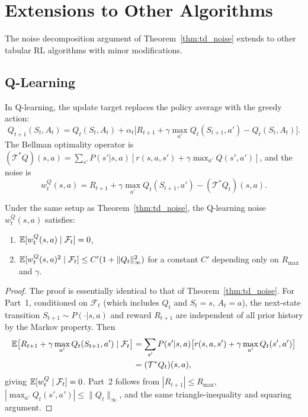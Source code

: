 \documentclass[11pt,a4paper]{article}
\begin{document}

\section{Extensions to Other Algorithms}
\label{sec:extensions}

The noise decomposition argument of Theorem~\ref{thm:td_noise}
extends to other tabular RL algorithms with minor modifications.

\subsection{Q-Learning}

In Q-learning, the update target replaces the policy average
with the greedy action:
\begin{equation}
  Q_{t+1}(S_t, A_t)
  = Q_t(S_t, A_t) + \alpha_t
    \bigl[R_{t+1} + \gamma \max_{a'} Q_t(S_{t+1}, a')
    - Q_t(S_t, A_t)\bigr].
  \label{eq:qlearning}
\end{equation}
The Bellman optimality operator is
$(\mathcal{T}^* Q)(s,a) = \sum_{s'} P(s'|s,a)
[r(s,a,s') + \gamma \max_{a'} Q(s',a')]$, and the noise is
\begin{equation}
  w_t^Q(s,a)
  = R_{t+1} + \gamma \max_{a'} Q_t(S_{t+1}, a')
    - (\mathcal{T}^* Q_t)(s,a).
  \label{eq:qnoise}
\end{equation}

\begin{proposition}
\label{prop:q_noise}
Under the same setup as Theorem~\ref{thm:td_noise}, the
Q-learning noise $w_t^Q(s,a)$ satisfies:
\begin{enumerate}[nosep]
  \item $\mathbb{E}[w_t^Q(s,a) \mid \mathcal{F}_t] = 0$,
  \item $\mathbb{E}[w_t^Q(s,a)^2 \mid \mathcal{F}_t]
    \leq C'(1 + \|Q_t\|_\infty^2)$
    for a constant $C'$ depending only on $R_{\max}$ and
    $\gamma$.
\end{enumerate}
\end{proposition}

\begin{proof}
The proof is essentially identical to that of
Theorem~\ref{thm:td_noise}.  For Part~1, conditioned on
$\mathcal{F}_t$ (which includes $Q_t$ and $S_t = s$,
$A_t = a$), the next-state transition
$S_{t+1} \sim P(\cdot|s,a)$ and reward $R_{t+1}$ are
independent of all prior history by the Markov property.  Then
\begin{align}
  \mathbb{E}\bigl[R_{t+1} + \gamma \max_{a'} Q_t(S_{t+1}, a')
    \mid \mathcal{F}_t\bigr]
  &= \sum_{s'} P(s'|s,a)
    \bigl[r(s,a,s')
    + \gamma \max_{a'} Q_t(s', a')\bigr] \nonumber\\
  &= (\mathcal{T}^* Q_t)(s,a),
\end{align}
giving $\mathbb{E}[w_t^Q \mid \mathcal{F}_t] = 0$.  Part~2 follows
from $|R_{t+1}| \leq R_{\max}$,
$|\max_{a'} Q_t(s',a')| \leq \|Q_t\|_\infty$, and the same
triangle-inequality and squaring argument.
\end{proof}
\end{document}
